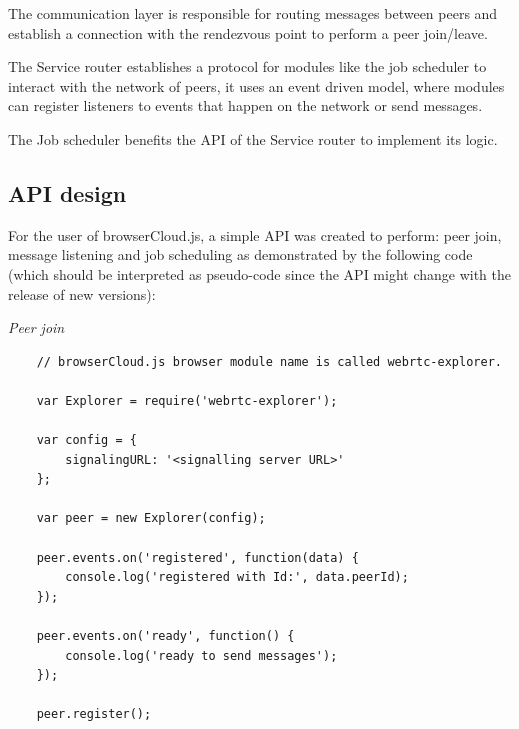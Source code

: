
The communication layer is responsible for routing messages between peers and establish a connection with the rendezvous point to perform a peer join/leave.


The Service router establishes a protocol for modules like the job scheduler to interact with the network of peers, it uses an event driven model, where modules can register listeners to events that happen on the network or send messages.


The Job scheduler benefits the API of the Service router to implement its logic.

\subsection{API design}

For the user of browserCloud.js, a simple API was created to perform: peer join, message listening and job scheduling as demonstrated by the following code (which should be interpreted as pseudo-code since the API might change with the release of new versions):


\textit{Peer join}
\begingroup
\scriptsize
\begin{verbatim}
    // browserCloud.js browser module name is called webrtc-explorer.

    var Explorer = require('webrtc-explorer');

    var config = {
        signalingURL: '<signalling server URL>'
    };

    var peer = new Explorer(config);

    peer.events.on('registered', function(data) {
        console.log('registered with Id:', data.peerId);
    });

    peer.events.on('ready', function() {
        console.log('ready to send messages');
    });

    peer.register();
\end{verbatim}
\endgroup

